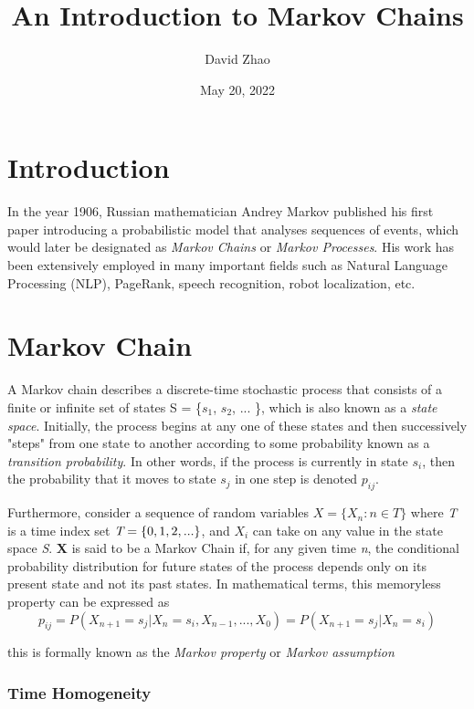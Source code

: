 \documentclass[a4paper, 12pt]{article}
\begin{document}
\title{An Introduction to Markov Chains}
\author{David Zhao}
\date{May 20, 2022}
\maketitle
{}

\section*{Introduction}

In the year 1906, Russian mathematician Andrey Markov published his first paper
introducing a probabilistic model that analyses sequences of events, 
which would later be designated as \emph{Markov Chains} or \emph{Markov Processes}. His work has been extensively employed
in many important fields such as Natural Language Processing (NLP), PageRank, speech recognition, robot localization, etc.

\section*{Markov Chain}

	A Markov chain describes a discrete-time stochastic process that consists of a finite or infinite set of states S = \{$s_1$, $s_2$, ... \}, which is also known as a \emph{state space}. Initially, the process begins at any one of these states and then successively "steps" from one state to another according to some probability known as a \emph{transition probability}. In other words, if the process is currently in state \emph{$s_i$}, then the probability that it moves to state \emph{$s_j$} in one step is denoted \emph{$p_{ij}$}.\newline

	
	Furthermore, consider a sequence of random variables $X = \{X_n : n \in T\}$ where \emph{T} is a time index set $\emph{T} = \{0,1,2,...\}$, and \emph{$X_i$} can take on any value in the state space \emph{S}. \textbf{X} is said to be a Markov Chain if, for any given time \emph{n}, the conditional probability distribution for future states of the process depends only on its present state and not its past states. In mathematical terms, this memoryless property can be expressed as
	\[
	p_{ij} = P(X_{n+1} = s_j | X_{n} = s_i, X_{n-1}, ... , X_0) = P(X_{n+1} = s_j | X_{n}= s_i)
	\]

	this is formally known as the \emph{Markov property} or \emph{Markov assumption}
	
	\subsubsection*{Time Homogeneity}
	
\end{document}

